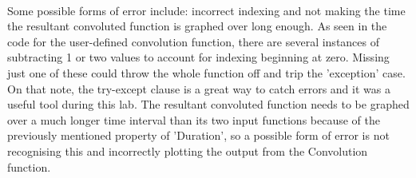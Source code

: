 \documentclass[12pt]{report}
\begin{document}
\paragraph{} Some possible forms of error include: incorrect indexing and not making the time the resultant convoluted function is graphed over long enough. As seen in the code for the user-defined convolution function, there are several instances of subtracting 1 or two values to account for indexing beginning at zero. Missing just one of these could throw the whole function off and trip the 'exception' case. On that note, the try-except clause is a great way to catch errors and it was a useful tool during this lab. The resultant convoluted function needs to be graphed over a much longer time interval than its two input functions because of the previously mentioned property of 'Duration', so a possible form of error is not recognising this and incorrectly plotting the output from the Convolution function.
\end{document}
